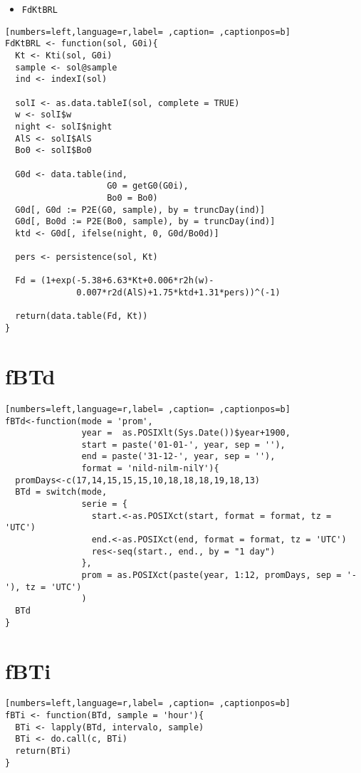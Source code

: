 \begin{itemize}
\item \texttt{FdKtBRL}
\end{itemize}
\begin{lstlisting}[numbers=left,language=r,label= ,caption= ,captionpos=b]
FdKtBRL <- function(sol, G0i){
  Kt <- Kti(sol, G0i)
  sample <- sol@sample
  ind <- indexI(sol)

  solI <- as.data.tableI(sol, complete = TRUE)
  w <- solI$w
  night <- solI$night
  AlS <- solI$AlS
  Bo0 <- solI$Bo0

  G0d <- data.table(ind,
                    G0 = getG0(G0i),
                    Bo0 = Bo0)
  G0d[, G0d := P2E(G0, sample), by = truncDay(ind)]
  G0d[, Bo0d := P2E(Bo0, sample), by = truncDay(ind)]
  ktd <- G0d[, ifelse(night, 0, G0d/Bo0d)]

  pers <- persistence(sol, Kt)

  Fd = (1+exp(-5.38+6.63*Kt+0.006*r2h(w)-
              0.007*r2d(AlS)+1.75*ktd+1.31*pers))^(-1)

  return(data.table(Fd, Kt))
}
\end{lstlisting}
\section{fBTd}
\label{sec:orga8ab766}
\begin{lstlisting}[numbers=left,language=r,label= ,caption= ,captionpos=b]
fBTd<-function(mode = 'prom',
               year =  as.POSIXlt(Sys.Date())$year+1900,
               start = paste('01-01-', year, sep = ''),
               end = paste('31-12-', year, sep = ''), 
               format = 'nild-nilm-nilY'){
  promDays<-c(17,14,15,15,15,10,18,18,18,19,18,13)
  BTd = switch(mode,
               serie = {
                 start.<-as.POSIXct(start, format = format, tz = 'UTC')
                 end.<-as.POSIXct(end, format = format, tz = 'UTC')
                 res<-seq(start., end., by = "1 day")
               },
               prom = as.POSIXct(paste(year, 1:12, promDays, sep = '-'), tz = 'UTC')
               )
  BTd
}
\end{lstlisting}
\section{fBTi}
\label{sec:orgc2f2d5c}
\begin{lstlisting}[numbers=left,language=r,label= ,caption= ,captionpos=b]
fBTi <- function(BTd, sample = 'hour'){
  BTi <- lapply(BTd, intervalo, sample)
  BTi <- do.call(c, BTi)
  return(BTi)
}
\end{lstlisting}
